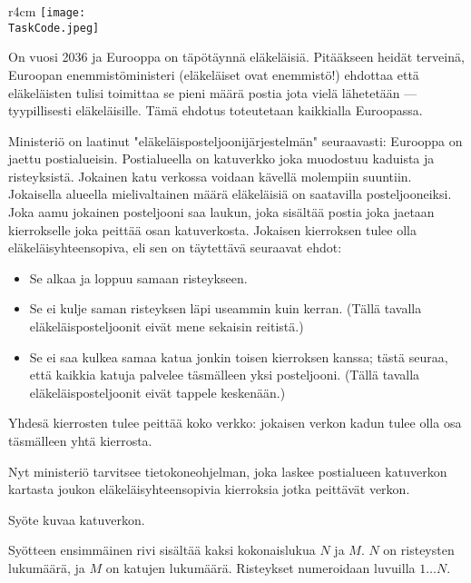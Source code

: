 \documentclass{boi2014-fi}
\renewcommand{\TaskCode}{postmen}
\begin{document}
    \begin{wrapfigure}[8]{r}{4cm}
        \vspace{-18pt}
        \texttt{[image: \\TaskCode.jpeg]}
    \end{wrapfigure}
    
    On vuosi 2036 ja Eurooppa on täpötäynnä eläkeläisiä. Pitääkseen
    heidät terveinä, Euroopan enemmistöministeri (eläkeläiset ovat
    enemmistö!) ehdottaa että eläkeläisten tulisi toimittaa se pieni määrä
    postia jota vielä lähetetään --- tyypillisesti eläkeläisille. Tämä ehdotus
    toteutetaan kaikkialla Euroopassa.
    
    Ministeriö on laatinut "eläkeläisposteljoonijärjestelmän" seuraavasti:
    Eurooppa on jaettu postialueisin. Postialueella on katuverkko joka muodostuu
    kaduista ja risteyksistä. Jokainen katu verkossa voidaan kävellä molempiin 
    suuntiin. Jokaisella alueella mielivaltainen määrä eläkeläisiä on saatavilla
    posteljooneiksi. Joka aamu jokainen posteljooni saa laukun, joka sisältää
    postia joka jaetaan kierrokselle joka peittää osan katuverkosta. Jokaisen
    kierroksen tulee olla eläkeläisyhteensopiva, eli sen on täytettävä seuraavat
    ehdot:
    \begin{itemize}
        \item Se alkaa ja loppuu samaan risteykseen.
        \item Se ei kulje saman risteyksen läpi useammin kuin kerran. (Tällä
            tavalla eläkeläisposteljoonit eivät mene sekaisin reitistä.)
        \item Se ei saa kulkea samaa katua jonkin toisen kierroksen kanssa;
            tästä seuraa, että kaikkia katuja palvelee täsmälleen yksi
            posteljooni. (Tällä tavalla eläkeläisposteljoonit eivät tappele
            keskenään.)
    \end{itemize}

    Yhdesä kierrosten tulee peittää koko verkko: jokaisen verkon kadun tulee
    olla osa täsmälleen yhtä kierrosta.

    \Task
    Nyt ministeriö tarvitsee tietokoneohjelman, joka laskee postialueen katuverkon 
    kartasta joukon eläkeläisyhteensopivia kierroksia jotka peittävät verkon.

    \Input
    Syöte kuvaa katuverkon.
    
    Syötteen ensimmäinen rivi sisältää kaksi kokonaislukua $N$ ja $M$. $N$ on
    risteysten lukumäärä, ja $M$ on katujen lukumäärä. Risteykset numeroidaan
    luvuilla $1\ldots N$.
\end{document}
